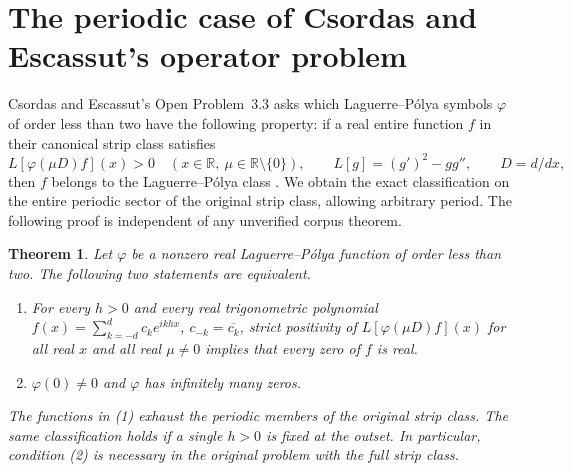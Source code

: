 \documentclass[11pt]{article}
\newtheorem{theorem}{Theorem}[section]
\begin{document}
\section{The periodic case of Csordas and Escassut's operator problem}
\label{sec:periodic-detector}

Csordas and Escassut's Open Problem~3.3 asks which Laguerre--P\'olya
symbols $\varphi$ of order less than two have the following property:
if a real entire function $f$ in their canonical strip class satisfies
\[
 L[\varphi(\mu D)f](x)>0
 \quad (x\in\mathbb R,\ \mu\in\mathbb R\setminus\{0\}),
 \qquad L[g]=(g')^2-gg'',\qquad D=d/dx,
\]
then $f$ belongs to the Laguerre--P\'olya class \cite{ce}.
We obtain the exact classification on the entire periodic sector of the
original strip class, allowing arbitrary period. The
following proof is independent of any unverified corpus theorem.

\begin{theorem}
Let $\varphi$ be a nonzero real Laguerre--P\'olya function of order
less than two. The following two statements are equivalent.
\begin{enumerate}
\item For every $h>0$ and every real trigonometric polynomial
$f(x)=\sum_{k=-d}^d c_k e^{ikhx}$,
$c_{-k}=\overline{c_k}$, strict positivity of
$L[\varphi(\mu D)f](x)$ for all real $x$ and all real $\mu\ne0$
implies that every zero of $f$ is real.
\item $\varphi(0)\ne0$ and $\varphi$ has infinitely many zeros.
\end{enumerate}
The functions in (1) exhaust the periodic members of the original strip
class. The same classification holds if a single $h>0$ is fixed at the outset.
In particular, condition (2) is necessary in the original problem
with the full strip class.
\end{theorem}
\end{document}
